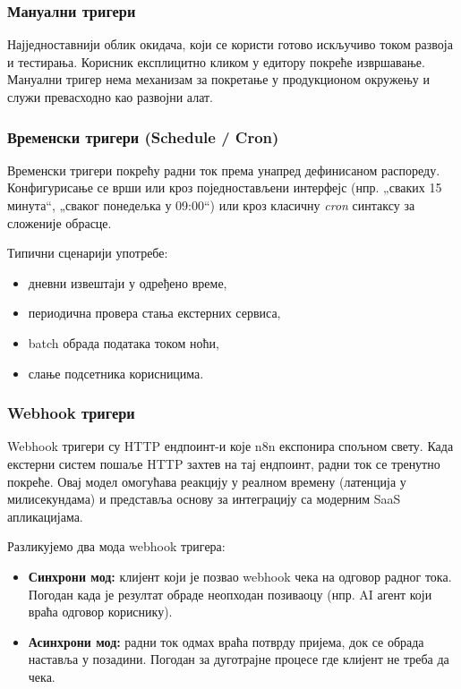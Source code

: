 \subsubsection{Мануални тригери}

Најједноставнији облик окидача, који се користи готово искључиво
током развоја и тестирања. Корисник експлицитно кликом у едитору
покреће извршавање. Мануални тригер нема механизам за покретање
у продукционом окружењу и служи превасходно као развојни алат.

\subsubsection{Временски тригери (Schedule / Cron)}

Временски тригери покрећу радни ток према унапред дефинисаном
распореду. Конфигурисање се врши или кроз поједностављени интерфејс
(нпр. „сваких 15 минута“, „сваког понедељка у 09:00“) или кроз
класичну \textit{cron} синтаксу за сложеније обрасце.

Типични сценарији употребе:
\begin{itemize}
    \item дневни извештаји у одређено време,
    \item периодична провера стања екстерних сервиса,
    \item batch обрада података током ноћи,
    \item слање подсетника корисницима.
\end{itemize}

\subsubsection{Webhook тригери}

Webhook тригери су HTTP ендпоинт-и које n8n експонира спољном
свету. Када екстерни систем пошаље HTTP захтев на тај ендпоинт,
радни ток се тренутно покреће. Овај модел омогућава реакцију у
реалном времену (латенција у милисекундама) и представља основу
за интеграцију са модерним SaaS апликацијама.

Разликујемо два мода webhook тригера:
\begin{itemize}
    \item \textbf{Синхрони мод:} клијент који је позвао webhook чека
    на одговор радног тока. Погодан када је резултат обраде неопходан
    позиваоцу (нпр. AI агент који враћа одговор кориснику).
    \item \textbf{Асинхрони мод:} радни ток одмах враћа потврду
    пријема, док се обрада наставља у позадини. Погодан за
    дуготрајне процесе где клијент не треба да чека.
\end{itemize}

